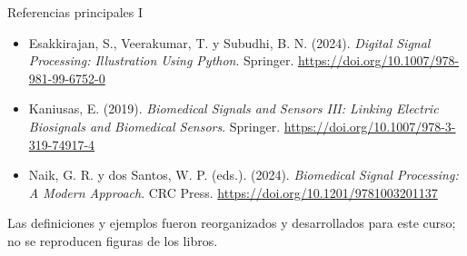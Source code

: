 \documentclass[
  ignorenonframetext,
  aspectratio=169,
  spanish,
  professionalfonts]{beamer}
\providecommand{\tightlist}{%
  \setlength{\itemsep}{0pt}\setlength{\parskip}{0pt}}
\begin{document}
\begin{frame}{Referencias principales I}
\protect{}\label{referencias-principales-i}
\begin{itemize}
\tightlist
\item
  Esakkirajan, S., Veerakumar, T. y Subudhi, B. N. (2024). \emph{Digital
  Signal Processing: Illustration Using Python}. Springer.
  \url{https://doi.org/10.1007/978-981-99-6752-0}
\item
  Kaniusas, E. (2019). \emph{Biomedical Signals and Sensors III: Linking
  Electric Biosignals and Biomedical Sensors}. Springer.
  \url{https://doi.org/10.1007/978-3-319-74917-4}
\item
  Naik, G. R. y dos Santos, W. P. (eds.). (2024). \emph{Biomedical
  Signal Processing: A Modern Approach}. CRC Press.
  \url{https://doi.org/10.1201/9781003201137}
\end{itemize}

\begin{tcolorbox}[enhanced jigsaw, arc=.35mm, bottomrule=.15mm, bottomtitle=1mm, breakable, colback=white, colbacktitle=quarto-callout-note-color!10!white, colframe=quarto-callout-note-color-frame, coltitle=black, left=2mm, leftrule=.75mm, opacityback=0, opacitybacktitle=0.6, rightrule=.15mm, title={Uso de fuentes}, titlerule=0mm, toprule=.15mm, toptitle=1mm]

Las definiciones y ejemplos fueron reorganizados y desarrollados para
este curso; no se reproducen figuras de los libros.

\end{tcolorbox}
\end{frame}
\end{document}
